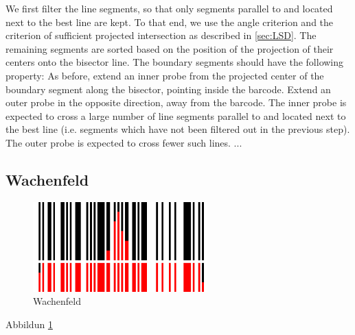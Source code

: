 We first filter the line segments, so that only segments parallel to and located
next to the best
line are kept. To that end, we use the angle criterion and the criterion of sufficient
projected intersection as described in \cref{sec:LSD}. The remaining segments
are sorted based on the position of the projection of their centers onto the
bisector line. The boundary segments should have the following property: As before,
extend an inner probe from the projected center of the boundary segment along the bisector, pointing inside the
barcode. Extend an outer probe in the opposite direction, away from the barcode.
The inner probe is expected to cross a large number of line segments parallel to
and located next to the best line (i.e. segments which have not been
filtered out in the previous step). The outer probe is expected to cross fewer
such lines.
...

\subsection[Wachenfeld]{Wachenfeld \cite{wachenfeld2008robust}}
\begin{figure}[t]
\center
\includegraphics[width=0.6\textwidth,natwidth=900,natheight=463]{img/wachenfeld.png}
\caption{Wachenfeld}
\label{wachenfeld}
\end{figure}
Abbildun \ref{wachenfeld}

